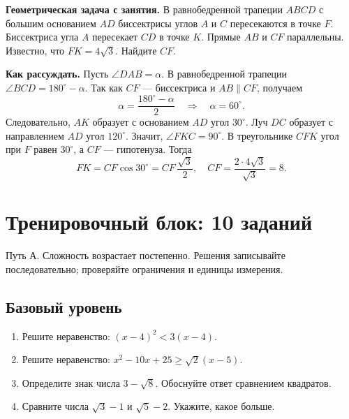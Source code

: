 \documentclass[a4paper,11pt]{article}
\newcommand{\secname}[1]{\section*{\textcolor{darkaccent}{#1}}}
\begin{document}
\textbf{Геометрическая задача с занятия.} В равнобедренной трапеции \(ABCD\) с большим основанием \(AD\) биссектрисы углов \(A\) и \(C\) пересекаются в точке \(F\). Биссектриса угла \(A\) пересекает \(CD\) в точке \(K\). Прямые \(AB\) и \(CF\) параллельны. Известно, что \(FK=4\sqrt3\). Найдите \(CF\).
\begin{center}
\end{center}
\textbf{Как рассуждать.} Пусть \(\angle DAB=\alpha\). В равнобедренной трапеции \(\angle BCD=180^\circ-\alpha\). Так как \(CF\) --- биссектриса и \(AB\parallel CF\), получаем
\[
\alpha=\frac{180^\circ-\alpha}{2}
\quad\Longrightarrow\quad \alpha=60^\circ.
\]
Следовательно, \(AK\) образует с основанием \(AD\) угол \(30^\circ\). Луч \(DC\) образует с направлением \(AD\) угол \(120^\circ\). Значит, \(\angle FKC=90^\circ\). В треугольнике \(CFK\) угол при \(F\) равен \(30^\circ\), а \(CF\) --- гипотенуза. Тогда
\[
FK=CF\cos30^\circ=CF\,\frac{\sqrt3}{2},
\quad CF=\frac{2\cdot4\sqrt3}{\sqrt3}=\boxed{8}.
\]

\clearpage
\secname{Тренировочный блок: 10 заданий}
\textcolor{muted}{Путь А. Сложность возрастает постепенно. Решения записывайте последовательно; проверяйте ограничения и единицы измерения.}
\subsection*{Базовый уровень}
\begin{enumerate}
\item Решите неравенство: \((x-4)^2<3(x-4)\).
\item Решите неравенство: \(x^2-10x+25\ge\sqrt2(x-5)\).
\item Определите знак числа \(3-\sqrt8\). Обоснуйте ответ сравнением квадратов.
\item Сравните числа \(\sqrt3-1\) и \(\sqrt5-2\). Укажите, какое больше.
\end{enumerate}
\end{document}
